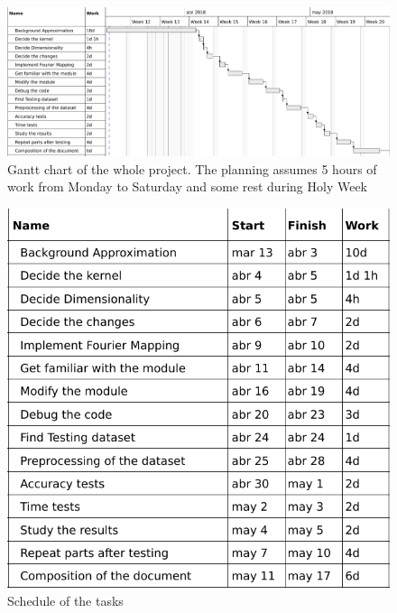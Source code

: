 \documentclass[a4paper]{article}
\begin{document}
    \begin{figure}[H]
    \centering
    \includegraphics[width=\textwidth]{gant}
    \caption{Gantt chart of the whole project. The planning assumes 5 hours of work from Monday to Saturday and some rest during Holy Week}
    \end{figure}


    \begin{figure}[H]
    \centering
    \includegraphics[width=\textwidth]{schedule}
    \caption{Schedule of the tasks}
    \end{figure}




\end{document}
